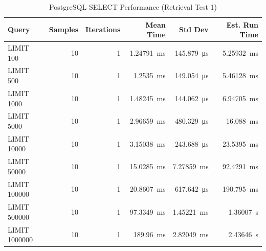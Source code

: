 \documentclass[14pt,a4paper]{article}
\begin{document}
    \begin{table}[H]
        \centering        
        \begin{tabular}{lrrrrr}
            \toprule
            \textbf{Query} & \textbf{Samples} & \textbf{Iterations} & \textbf{Mean Time} & \textbf{Std Dev} & \textbf{Est. Run Time} \\
            \midrule
            LIMIT 100 & 10 & 1 & \qty{1.24791}{\milli\second} & \qty{145.879}{\micro\second} & \qty{5.25932}{\milli\second} \\
            LIMIT 500 & 10 & 1 & \qty{1.2535}{\milli\second} & \qty{149.054}{\micro\second} & \qty{5.46128}{\milli\second} \\
            LIMIT 1000 & 10 & 1 & \qty{1.48245}{\milli\second} & \qty{144.062}{\micro\second} & \qty{6.94705}{\milli\second} \\
            LIMIT 5000 & 10 & 1 & \qty{2.96659}{\milli\second} & \qty{480.329}{\micro\second} & \qty{16.088}{\milli\second} \\
            LIMIT 10000 & 10 & 1 & \qty{3.15038}{\milli\second} & \qty{243.688}{\micro\second} & \qty{23.5395}{\milli\second} \\
            LIMIT 50000 & 10 & 1 & \qty{15.0285}{\milli\second} & \qty{7.27859}{\milli\second} & \qty{92.4291}{\milli\second} \\
            LIMIT 100000 & 10 & 1 & \qty{20.8607}{\milli\second} & \qty{617.642}{\micro\second} & \qty{190.795}{\milli\second} \\
            LIMIT 500000 & 10 & 1 & \qty{97.3349}{\milli\second} & \qty{1.45221}{\milli\second} & \qty{1.36007}{\second} \\
            LIMIT 1000000 & 10 & 1 & \qty{189.96}{\milli\second} & \qty{2.82049}{\milli\second} & \qty{2.43646}{\second} \\
            \bottomrule
        \end{tabular}
        \caption{PostgreSQL SELECT Performance (Retrieval Test 1)}
    \end{table}
    
\end{document}
